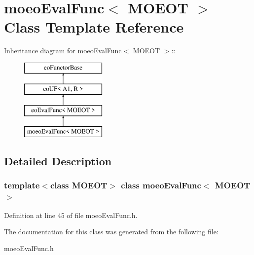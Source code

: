 \section{moeo\-Eval\-Func$<$ MOEOT $>$ Class Template Reference}
\label{classmoeoEvalFunc}
Inheritance diagram for moeo\-Eval\-Func$<$ MOEOT $>$::\begin{figure}[H]
\begin{center}
\leavevmode
\includegraphics[height=4cm]{classmoeoEvalFunc}
\end{center}
\end{figure}


\subsection{Detailed Description}
\subsubsection*{template$<$class MOEOT$>$ class moeo\-Eval\-Func$<$ MOEOT $>$}





Definition at line 45 of file moeo\-Eval\-Func.h.

The documentation for this class was generated from the following file:\begin{CompactItemize}
\item 
moeo\-Eval\-Func.h\end{CompactItemize}
